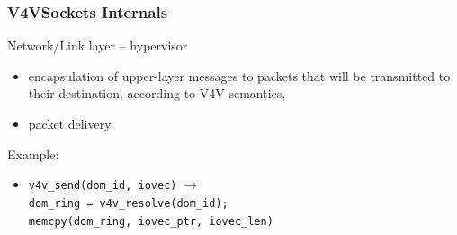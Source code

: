 \documentclass[red,slidestop,notes,compress,mathserif]{beamer}
\begin{document}
\begin{frame}
\frametitle{V4VSockets Internals}
\begin{block}{Network/Link layer -- hypervisor}
\begin{itemize} 
\item encapsulation of upper-layer messages to packets that will be transmitted
to their destination, according to V4V semantics,
\item packet delivery.
\end{itemize}
\end{block}

\begin{block}{Example:}
\begin{itemize}
\item \texttt{v4v\_send(dom\_id, iovec)} $\rightarrow$ \\\texttt{dom\_ring = v4v\_resolve(dom\_id); \\memcpy(dom\_ring, iovec\_ptr, iovec\_len)}
\end{itemize}
\end{block}
\end{frame}
\end{document}
